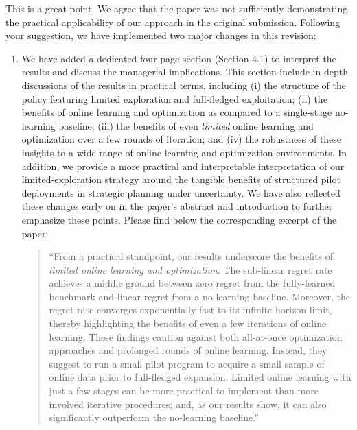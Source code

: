 \documentclass[11pt]{article}
\begin{document}
This is a great point. We agree that the paper was not sufficiently demonstrating the practical applicability of our approach in the original submission. Following your suggestion, we have implemented two major changes in this revision:
\begin{enumerate}
    \item We have added a dedicated four-page section (Section 4.1) to interpret the results and discuss the managerial implications. This section include in-depth discussions of the results in practical terms, including (i) the structure of the policy featuring limited exploration and full-fledged exploitation; (ii) the benefits of online learning and optimization as compared to a single-stage no-learning baseline; (iii) the benefits of even \textit{limited} online learning and optimization over a few rounds of iteration; and (iv) the robustness of these insights to a wide range of online learning and optimization environments. In addition, we provide a more practical and interpretable interpretation of our limited-exploration strategy around the tangible benefits of structured pilot deployments in strategic planning under uncertainty. We have also reflected these changes early on in the paper's abstract and introduction to further emphasize these points. Please find below the corresponding excerpt of the paper:
    \begin{quote}
        ``From a practical standpoint, our results underscore the benefits of \textit{limited online learning and optimization}. The sub-linear regret rate achieves a middle ground between zero regret from the fully-learned benchmark and linear regret from a no-learning baseline. Moreover, the regret rate converges exponentially fast to its infinite-horizon limit, thereby highlighting the benefits of even a few iterations of online learning. These findings caution against both all-at-once optimization approaches and prolonged rounds of online learning. Instead, they suggest to run a small pilot program to acquire a small sample of online data prior to full-fledged expansion. Limited online learning with just a few stages can be more practical to implement than more involved iterative procedures; and, as our results show, it can also significantly outperform the no-learning baseline.''
    \end{quote}

\end{enumerate}
\end{document}
